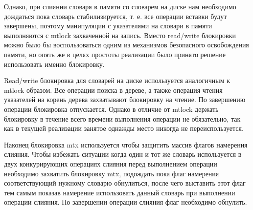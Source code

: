 Однако, при слиянии словаря в памяти со словарем на диске нам необходимо
дождаться пока словарь стабилизируется, т. е. все операции вставки будут
завершены, поэтому манипуляции с указателями на словари в памяти выполняются с
mtlock захваченной на запись. Вместо read/write блокировки можно было бы
воспользоваться одним из механизмов безопасного освобождения памяти, но опять же
в целях простоты реализации было принято решение использовать именно блокировку.

Read/write блокировка для словарей на диске используется аналогичным к mtlock
образом. Все операции поиска в дереве, а также операция чтения указателей на
корень дерева захватывают блокировку на чтение. По завершению операции
блокировка отпускается. Однако в отличие от mtlock держать блокировку в течение
всего времени выполнения операции не обязательно, так как в текущей реализации
занятое однажды место никогда не переиспользуется.

Наконец блокировка mtx используется чтобы защитить массив флагов намерения
слияния. Чтобы избежать ситуации когда один и тот же словарь используется в двух
конкурирующих операциях слияния перед выполнением операции необходимо захватить
блокировку mtx, подождать пока флаг намерения соответствующий нужному словарю
обнулиться, после чего выставить этот флаг тем самым показав намерение
использовать данный словарь при выполнении операции слияния. По завершении
операции слияния флаг необходимо обнулить.
